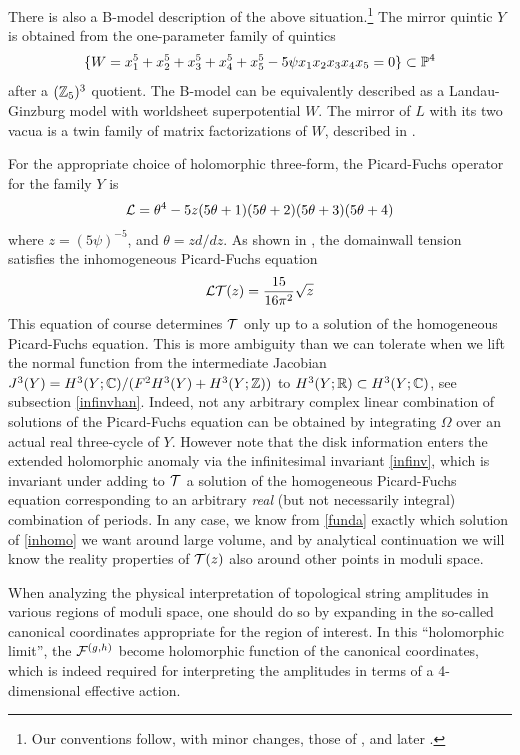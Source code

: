 There is also a B-model description of the above situation.\footnote{Our
conventions follow, with minor changes, those of \cite{cdgp,bcov2}, and 
later \cite{hkq}.} The mirror quintic $Y$ is obtained from the one-parameter 
family of quintics
\begin{equation}
\{W=x_1^5+x_2^5+x_3^5+x_4^5+x_5^5 - 5\psi x_1x_2x_3x_4x_5 = 0\}\subset
{\mathbb P}^4
\end{equation}
after a $({\mathbb Z}_5)^3$ quotient. The B-model can be equivalently described 
as a Landau-Ginzburg model with worldsheet superpotential $W$. The
mirror of $L$ with its two vacua is a twin family of matrix 
factorizations of $W$, described in \cite{howa,mowa}.

For the appropriate choice of holomorphic three-form, the Picard-Fuchs 
operator for the family $Y$ is
\begin{equation}
{\cal L} = \theta^4 - 5 z (5\theta+1)(5\theta+2)(5\theta+3)(5\theta+4)
\end{equation}
where $z=(5\psi)^{-5}$, and $\theta=zd/dz$. As shown in \cite{open,psw,mowa}, 
the domainwall tension satisfies the inhomogeneous Picard-Fuchs equation 
\begin{equation}
\eqlabel{inhomo}
\call \calt(z) = \frac{15}{16\pi^2} \sqrt{z}
\end{equation}
This equation of course determines ${\cal T}$ only up to a solution of
the homogeneous Picard-Fuchs equation. This is more ambiguity than
we can tolerate when we lift the normal function from the intermediate
Jacobian $J^3(Y)=H^3(Y;{\mathbb C})/ (F^2H^3(Y)+H^3(Y;{\mathbb Z}))$ to $H^3(Y;{\mathbb R})
\subset H^3(Y;{\mathbb C})$, see subsection \ref{infinvhan}. Indeed, not 
any arbitrary complex linear combination of solutions of the Picard-Fuchs 
equation can be obtained by integrating $\Omega$ over an actual real 
three-cycle of $Y$. However note that the disk information enters the 
extended holomorphic anomaly via the infinitesimal invariant 
\eqref{infinv}, which is invariant under adding to ${\cal T}$ a solution
of the homogeneous Picard-Fuchs equation corresponding to an arbitrary
{\it real} (but not necessarily integral) combination of periods. 
In any case, we know from \eqref{funda} exactly which solution of
\eqref{inhomo} we want around large volume, and by analytical continuation
we will know the reality properties of ${\cal T}(z)$ also around other
points in moduli space.

When analyzing the physical interpretation of topological string 
amplitudes in various regions of moduli space, one should do so by 
expanding in the so-called canonical coordinates appropriate for the 
region of interest. In this ``holomorphic limit'', the ${{\cal F}}^{(g,h)}$ 
become holomorphic function of the canonical coordinates, which is
indeed required for interpreting the amplitudes in terms of a
4-dimensional effective action. 

